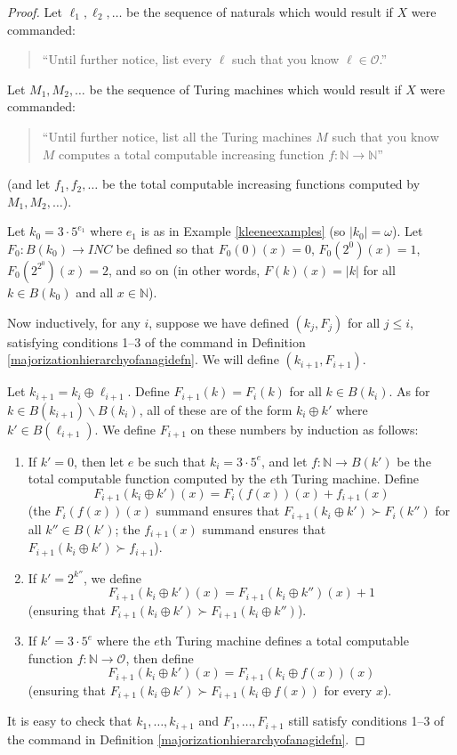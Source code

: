 \documentclass{article}
\begin{document}
\begin{proof}
    Let $\ell_1,\ell_2,\ldots$ be the sequence of naturals which would result if
    $X$ were commanded:
    \begin{quote}
        ``Until further notice, list every $\ell$ such that you know
        $\ell\in\mathcal O$.''
    \end{quote}
    Let $M_1,M_2,\ldots$ be the sequence of Turing machines which would result if
    $X$ were commanded:
    \begin{quote}
        ``Until further notice, list all the Turing machines $M$ such that you know
        $M$ computes a total computable increasing function $f:\mathbb N\to\mathbb N$''
    \end{quote}
    (and let $f_1,f_2,\ldots$ be the total computable increasing functions
    computed by $M_1,M_2,\ldots$).

    Let $k_0=3\cdot 5^{e_1}$ where $e_1$ is as in Example
    \ref{kleeneexamples} (so $|k_0|=\omega$).
    Let $F_0:B(k_0)\to INC$ be defined so that $F_0(0)(x)=0$,
    $F_0(2^0)(x)=1$, $F_0(2^{2^0})(x)=2$, and so on (in other words,
    $F(k)(x)=|k|$ for all $k\in B(k_0)$ and all $x\in\mathbb N$).

    Now inductively, for any $i$, suppose we have defined $(k_j,F_j)$ for all $j\leq i$,
    satisfying conditions 1--3 of the command in
    Definition \ref{majorizationhierarchyofanagidefn}.
    We will define $(k_{i+1},F_{i+1})$.

    Let $k_{i+1}=k_i\oplus \ell_{i+1}$. Define $F_{i+1}(k)=F_i(k)$ for all $k\in B(k_i)$.
    As for $k\in B(k_{i+1})\backslash B(k_i)$, all of these are of the form
    $k_i\oplus k'$ where $k'\in B(\ell_{i+1})$. We define $F_{i+1}$ on these numbers
    by induction as follows:
    \begin{enumerate}
        \item
        If $k'=0$, then let $e$ be such that $k_i=3\cdot 5^e$, and let
        $f:\mathbb N\to B(k')$ be the total computable function computed by the $e$th
        Turing machine. Define
        \[
            F_{i+1}(k_i\oplus k')(x) = F_i(f(x))(x) + f_{i+1}(x)
        \]
        (the $F_i(f(x))(x)$ summand ensures that
        $F_{i+1}(k_i\oplus k')\succ F_i(k'')$ for all $k''\in B(k')$;
        the $f_{i+1}(x)$ summand ensures that $F_{i+1}(k_i\oplus k')\succ f_{i+1}$).
        \item
        If $k'=2^{k''}$, we define
        \[
            F_{i+1}(k_i\oplus k')(x)=F_{i+1}(k_i\oplus k'')(x)+1
        \]
        (ensuring that $F_{i+1}(k_i\oplus k')\succ F_{i+1}(k_i\oplus k'')$).
        \item
        If $k'=3\cdot 5^e$ where the $e$th Turing machine defines a total computable
        function $f:\mathbb N\to\mathcal O$,
        then define
        \[
            F_{i+1}(k_i\oplus k')(x) = F_{i+1}(k_i\oplus f(x))(x)
        \]
        (ensuring that $F_{i+1}(k_i\oplus k')\succ F_{i+1}(k_i\oplus f(x))$
        for every $x$).
    \end{enumerate}
    It is easy to check that $k_1,\ldots,k_{i+1}$ and $F_1,\ldots,F_{i+1}$
    still satisfy conditions 1--3 of the command in
    Definition \ref{majorizationhierarchyofanagidefn}.


\end{proof}
\end{document}
